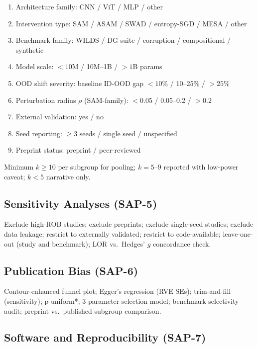 \begin{enumerate}[nosep]
\item Architecture family: CNN / ViT / MLP / other
\item Intervention type: SAM / ASAM / SWAD / entropy-SGD / MESA / other
\item Benchmark family: WILDS / DG-suite / corruption / compositional / synthetic
\item Model scale: $<10$M / 10M--1B / $>1$B params
\item OOD shift severity: baseline ID-OOD gap $<10\%$ / 10--25\% / $>25\%$
\item Perturbation radius $\rho$ (SAM-family): $<0.05$ / 0.05--0.2 / $>0.2$
\item External validation: yes / no
\item Seed reporting: $\geq 3$ seeds / single seed / unspecified
\item Preprint status: preprint / peer-reviewed
\end{enumerate}

Minimum $k \geq 10$ per subgroup for pooling; $k = 5$--9 reported with low-power caveat; $k < 5$ narrative only.

\subsection{Sensitivity Analyses (SAP-5)}

Exclude high-ROB studies; exclude preprints; exclude single-seed studies; exclude data leakage; restrict to externally validated; restrict to code-available; leave-one-out (study and benchmark); LOR vs.\ Hedges' $g$ concordance check.

\subsection{Publication Bias (SAP-6)}

Contour-enhanced funnel plot; Egger's regression (RVE SEs); trim-and-fill (sensitivity); p-uniform*; 3-parameter selection model; benchmark-selectivity audit; preprint vs.\ published subgroup comparison.

\subsection{Software and Reproducibility (SAP-7)}

